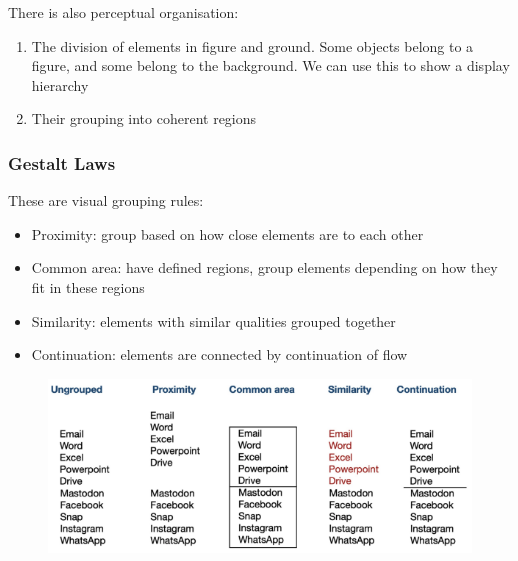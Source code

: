 \documentclass{article}
\begin{document}
There is also perceptual organisation:
\begin{enumerate}
    \item The division of elements in figure and ground. Some objects belong to a figure, and some belong to the background. We can use this to show a display hierarchy
    \item Their grouping into coherent regions
\end{enumerate}
\subsubsection*{Gestalt Laws}
These are visual grouping rules:
\begin{itemize}
    \item Proximity: group based on how close elements are to each other
    \item Common area: have defined regions, group elements depending on how they fit in these regions
    \item Similarity: elements with similar qualities grouped together
    \item Continuation: elements are connected by continuation of flow
\end{itemize}
\begin{figure}[H]
    \centering
    \includegraphics[width=0.8\linewidth]{Pictures/Screenshot 2023-02-22 at 15.59.34.png}
\end{figure}
\end{document}
